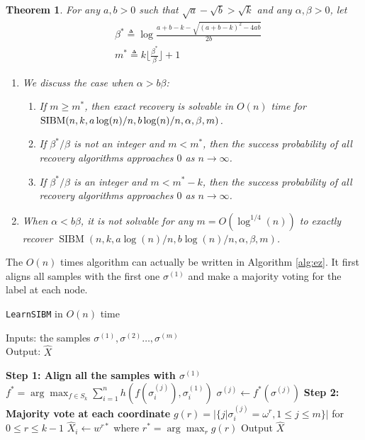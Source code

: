 \documentclass[conference]{IEEEtran}
\newtheorem{theorem}{Theorem}%
\DeclareMathOperator{\SIBM}{SIBM}
\begin{document}
	\begin{theorem} \label{thm:wt1}
		For any $a,b> 0$ such that $\sqrt{a}-\sqrt{b}> \sqrt{k}$ and any $\alpha,\beta>0$, let
		\begin{align} \label{eq:defstar}
		&\beta^\ast \triangleq
		\log\frac{a+b-k-\sqrt{(a+b-k)^2-4ab}}{2 b}  \\
		&m^\ast \triangleq k \Big\lfloor \frac{\beta^\ast}{\beta} \Big\rfloor +1 
		\end{align}
		\begin{enumerate}
			\item We discuss the case when $\alpha > b \beta$:
			\begin{enumerate}
				\item If $m\ge m^\ast$, then exact recovery is solvable in $O(n)$ time for $\SIBM(n,k, a\log(n)/n, \linebreak[4] b\log(n)/n,\alpha,\beta,m)$.
				\item If $\beta^\ast/\beta$ is not an integer and $m < m^\ast$, then the success probability of all recovery algorithms approaches $0$ as $n\to\infty$.
				\item If $\beta^\ast/\beta$ is an integer and $m < m^\ast - k$, then the success probability of all recovery algorithms approaches $0$ as $n\to\infty$.
			\end{enumerate}
			\item When $\alpha < b \beta$, it is not solvable for any $m=O(\log^{1/4}(n))$ to exactly recover $\SIBM(n,k, a\log(n)/n, b\log(n)/n,\alpha,\beta,m)$.
		\end{enumerate}
		
	\end{theorem}
	The $O(n)$ times algorithm can actually be written in Algorithm \ref{alg:ez}. It first aligns all samples with the first one $\sigma^{(1)}$ and
	make a majority voting for the label at each node.
	\begin{algorithm}
		\caption{\texttt{LearnSIBM} in $O(n)$ time} \label{alg:ez}
		Inputs: the samples $\sigma^{(1)},\sigma^{(2)}\dots,\sigma^{(m)}$ \\
		Output: $\hat{X}$
		\begin{algorithmic}[1]
			\Statex 
			{\bf Step 1: Align all the samples with $\sigma^{(1)}$ }
			\State $f^* = \arg\max_{f \in S_k} \sum_{i=1}^n h(f(\sigma^{(j)}_i), \sigma^{(1)}_i)$
			\State $\sigma^{(j)} \gets f^*(\sigma^{(j)})$
			\EndFor
			\Statex
			{\bf Step 2: Majority vote at each coordinate}
			\State $g(r) = |\{j | \sigma^{(j)}_i = \omega^r,1\leq j \leq m\}|$  for $ 0 \leq r \leq k-1$
			\State $\hat{X}_i \gets w^{r*}$ where $r^*=\arg\max_r g(r)$
			\State{}
			\EndFor
			\State Output $\hat{X}$
		\end{algorithmic}
	\end{algorithm}
	
\end{document}
